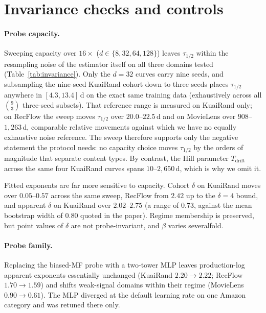 \documentclass[10pt,letterpaper]{article}
\newcommand{\Tdrift}{T_{\mathrm{drift}}}
\begin{document}
\section{Invariance checks and controls}
\label{sup:invariance}

\paragraph{Probe capacity.}
Sweeping capacity over $16\times$ ($d \in \{8, 32, 64, 128\}$) leaves
$\tau_{1/2}$ within the resampling noise of the estimator itself on all
three domains tested (Table~\ref{tab:invariance}). Only the $d = 32$ curves
carry nine seeds, and subsampling the nine-seed KuaiRand cohort down to three
seeds places $\tau_{1/2}$ anywhere in $[4.3, 13.4]$\,d on the exact same
training data (exhaustively across all $\binom{9}{3}$ three-seed subsets). That
reference range is measured on KuaiRand only; on RecFlow the sweep moves
$\tau_{1/2}$ over $20.0$--$22.5$\,d and on MovieLens over $908$--$1{,}263$\,d,
comparable relative movements against which we have no equally exhaustive noise
reference. The sweep therefore supports only the negative statement the
protocol needs: no capacity choice moves $\tau_{1/2}$ by the orders of
magnitude that separate content types. By contrast, the Hill parameter $\Tdrift$
across the same four KuaiRand curves spans $10$--$2{,}650$\,d, which is why we
omit it.

Fitted exponents are far more sensitive to capacity. Cohort $\delta$ on KuaiRand
moves over $0.05$--$0.57$ across the same sweep, RecFlow from $2.42$ up to the
$\delta = 4$ bound, and apparent $\delta$ on KuaiRand over $2.02$--$2.75$
(a range of $0.73$, against the mean bootstrap width of $0.80$ quoted in the
paper). Regime membership is preserved, but point values of $\delta$ are not
probe-invariant, and $\beta$ varies severalfold.

\paragraph{Probe family.}
Replacing the biased-MF probe with a two-tower MLP leaves production-log
apparent exponents essentially unchanged (KuaiRand $2.20 \to 2.22$; RecFlow
$1.70 \to 1.59$) and shifts weak-signal domains within their regime
(MovieLens $0.90 \to 0.61$). The MLP diverged at the default learning rate
on one Amazon category and was retuned there only.
\end{document}
